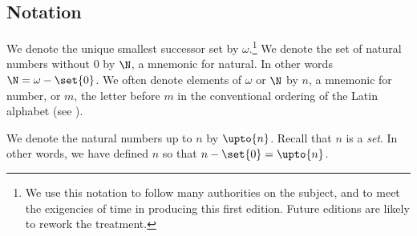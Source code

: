 \subsection*{Notation}


%    

We denote the unique smallest successor set by $\omega $.\footnote{We use this notation to follow many authorities on the subject, and to meet the exigencies of time in producing this first edition.
Future editions are likely to rework the treatment.}
We denote the set of natural numbers without 0 by $\N  $, a mnemonic for natural.
In other words $\N   = \omega  - \set{0}$.
We often denote elements of $\omega $ or $\N  $ by $n$, a mnemonic for number, or $m$, the letter before $m$ in the conventional ordering of the Latin alphabet (see ).

We denote the natural numbers up to $n$ by $\upto{n}$.
Recall that $n$ is a \textit{set}.
In other words, we have defined $n$ so that $n - \set{0} = \upto{n}$.

